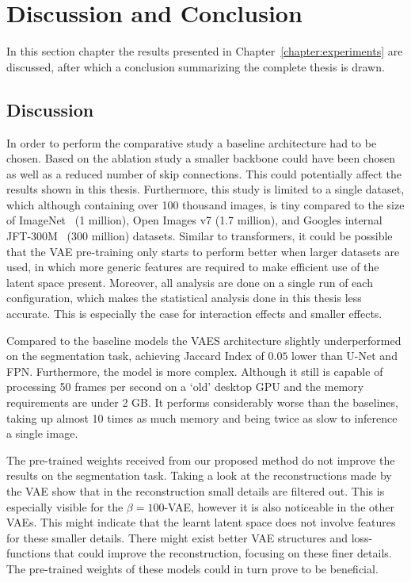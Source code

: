 \chapter{Discussion and Conclusion}\label{chapter:discussion}
In this section chapter the results presented in Chapter~\ref{chapter:experiments} are discussed, after which a conclusion summarizing the complete thesis is drawn. 

\section{Discussion}
In order to perform the comparative study a baseline architecture had to be chosen. Based on the ablation study a smaller backbone could have been chosen as well as a reduced number of skip connections. This could potentially affect the results shown in this thesis. Furthermore, this study is limited to a single dataset, which although containing over 100 thousand images, is tiny compared to the size of ImageNet~\cite{deng2009imagenet} (1 million), Open Images v7 \cite{OpenImages} (1.7 million), and Googles internal JFT-300M~\cite{DBLP:journals/corr/SunSSG17} (300 million) datasets. Similar to transformers, it could be possible that the VAE pre-training only starts to perform better when larger datasets are used, in which more generic features are required to make efficient use of the latent space present. Moreover, all analysis are done on a single run of each configuration, which makes the statistical analysis done in this thesis less accurate. This is especially the case for interaction effects and smaller effects.

Compared to the baseline models the VAES architecture slightly underperformed on the segmentation task, achieving Jaccard Index of $0.05$ lower than U-Net and FPN. Furthermore, the model is more complex. Although it still is capable of processing 50 frames per second on a `old' desktop GPU and the memory requirements are under 2 GB. It performs considerably worse than the baselines, taking up almost 10 times as much memory and being twice as slow to inference a single image.

The pre-trained weights received from our proposed method do not improve the results on the segmentation task. Taking a look at the reconstructions made by the VAE show that in the reconstruction small details are filtered out. This is especially visible for the $\beta=100$-VAE, however it is also noticeable in the other VAEs. This might indicate that the learnt latent space does not involve features for these smaller details. There might exist better VAE structures and loss-functions that could improve the reconstruction, focusing on these finer details. The pre-trained weights of these models could in turn prove to be beneficial.

